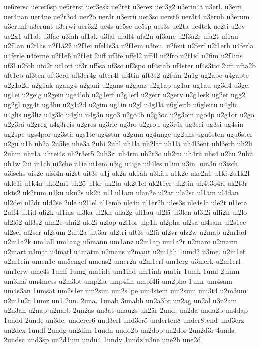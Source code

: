 {ue6rersc
uerer6sp
ue6rerst
uer3esk
ue2ret
u3erex
uer3g2
u3erin4t
u3erl.
u3ern
uer4nan
uer4ne
ue2r3o4
uer2ö
uer3r
u3errü
uer3sc
uerst6
uer3t4
u3eruh
u3erum
u3erunf
u3erunt
u3erwi
uer3z2
ue4s
ue5se
ue5sp
ues3s
ue2ta
ue4tek
ue2ti
u2ev
ue2x1
uf1ab
u3fac
u3fah
uf1ak
u3fal
ufall4
ufa2n
uf3ane
u2f3a2r
ufa2t
uf1au
u2f1än
u2f1äs
u2f1ä2ß
u2f1ei
ufel4s3a
u2f1em
u3fen.
u2fent
u2ferf
u2f1erh
u4ferla
u4ferle
u4ferne
u2f1eß
u2f1et
2uff
uf3fe
uffel2
uff4l
uf2fro
u2f1id
u2fim
u2f1ins
uf3l
u2fob
ufo2r
uf1ori
uf3r
uf5sä
uf3sc
uf2spo
uf4stab
uf4ster
uf4s3tic
2uft
ufta2b
uft1eb
uf3ten
uft3erd
uft3er4g
ufter4l
uf4tin
uft3s2
u2fum
2u1g
ug2abe
u4gabte
u2g1a2d
u2g1ak
ugang4
u2gani
u2gans
u2ganz
u2g1ap
ug1ar
ug1au
ug3d4
u3ge.
ug1ei
u2geig
u2gein
uge4lob
u2g1erf
u2g1erl
u2gerr
u2gerv
u2g1esk
ug2et
ugg2
ug2gl
ugg4t
ug3hu
u2g1i2d
u2gim
ug1in
u2gl
u4g1lä
u6gleitb
u6gleitu
u4glic
u4glis
ug3liz
u4g3lo
u4glu
u4g3n
ugo3
u2go4b
u2g3oc
u2g3om
ugo4p
u2g1or
u2gö
u2g3rä
u2greg
u4g3reis
u2gres
ug3rie
ug3ro
u2grou
ug3rüs
ug3sei
ug3si
ug4sin
ug2spe
ugs4por
ug3stä
ugs1te
ug4stur
u2gum
ug4unge
ug2uns
ugu6sten
ugu6ster
u2gü
u1h
uh2a
2u5he
uhe3a
2uhi
2uhl
uh1la
uh2lar
uh1lä
uh4l3ent
uhl3erb
uh2li
2uhm
uhr1a
uhrei4s
uh2r3er5
2uh3ri
uh4rin
uh2r3o
uh2ru
uh4rü
uhs4
u2hu
2uhü
uh1w
2ui
ui1ch
ui2che
u1ie
ui1em
u3ig
u4ige
uil4les
u1im
u3in.
uin3n
u3isch.
u3ischs
uis2e
uisi4n
ui2st
uit3s
u1j
uk2a
uk1äh
u3käu
u1k2e
uke2n1
u1ki
2u1k2l
ukle1i
u1k4n
uko2m1
uk2ö
u1kr
uk2ta
uk2t1el
uk2t1er
uk2tin
uk4t3o4ri
uk2t3r
ukts2
uk2tum
u1ku
uku2s
uk2ü
u1l
ul1am
ulan2e
ul2ar
ula2sc
ul1äm
ul4dan
ul2dei
ul2dr
uld2se
2ule
u2l1el
ul1emb
ule4n
ul1er2h
ules3s
ule4s1t
ule2t
ul1eta
2ulf4
ul1id
uli2k
ul1ins
ul3ka
ul2kn
ulla2g
ull1au
ul2lä
ul3len
ul3l2i
ulli2n
ul2lo
ul2lö2
ull3s2
ulm2e
ulni2
ulo2i
u2lop
u2l1or
ulp1h
ul2pha
ul2sa
ul4sam
ul2s1ec
ul2sei
ul2ser
ul2sum
2ult2a
ult3ar
ul2tri
ult3s
u2lü
ul2vr
ulz2w
u2mab
u2m1ad
u2m1a2k
um1all
um1ang
u5mann
um1anz
u2m1ap
um1a2r
u2marc
u2marm
u2mart
u3mat
u4matl
u4matm
u2maus
u2maut
u2m1äh
1umd2
u3me.
u2m1ef
u2m1ein
umen1e
um5engel
umens2
umer2a
u2m1erf
um1erg
u3merk
u2m1erl
um1erw
ume4s
1umf
1umg
um1ide
um1ind
um1inh
um1ir
1umk
1uml
2umm
um3mä
um4mess
u2m3ot
ump2fa
ump4fin
umpf4li
um2pho
1umr
um4sam
um4s3an
1umsat
um2s1er
um2sim
um2s1pe
um4stem
um2sum
um3t4
u2m3um
u2m1u2r
1umz
un1
2un.
2una.
1unab
3unabh
un2a3br
un2ag
un2al
u3n2am
u2n3an
u2nap
u2narb
2un2as
un3at
unau2s
un2är
2und.
un2da
unda2b
un4dap
1undd
2unde
un3de.
underer6
und3erf
und3erö
underten8
under8tend
und3erz
un2dex
1undf
2undg
un2dim
1undn
undo2b
un2dop
un2dor
2un2d3r
4unds.
2undsc
und3sp
un2d1um
undü4
1undv
1undz
u3ne
une2b
une2d
}
